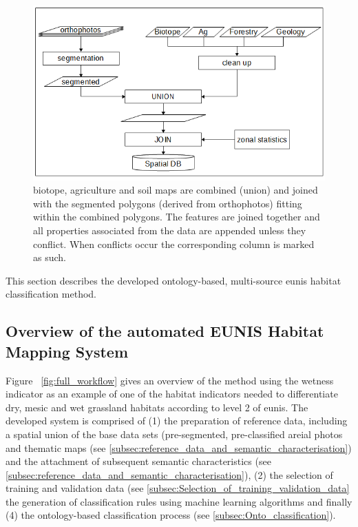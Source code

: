 \documentclass[authoryear,review,12pt,number]{elsarticle}
\begin{document}
\begin{figure} \includegraphics[width=1\textwidth]{diagrams/pre_processing.png}
    \caption{biotope, agriculture and soil maps are combined 
    (union) and joined with the segmented polygons (derived from 
    orthophotos) fitting within the combined polygons. The features are joined 
    together and all properties associated from the data are appended unless 
    they conflict. When conflicts occur the corresponding column is marked as 
    such.\label{fig:pre-processing}}
\end{figure}

This section describes the developed ontology-based, multi-source \gls{eunis} 
habitat classification method.
\label{subsec:method_overview}
\subsection{Overview of the automated EUNIS Habitat Mapping System}
Figure ~\ref{fig:full_workflow} gives an overview of the method using the
wetness indicator as an example of one of the habitat indicators needed to
differentiate dry, mesic and wet grassland habitats according to level 2 of
\gls{eunis}. The developed system is comprised of (1) the preparation of 
reference
data, including a spatial union of the base data sets (pre-segmented,
pre-classified areial photos and thematic maps (see
\ref{subsec:reference_data_and_semantic_characterisation}) and the attachment of
subsequent semantic characteristics (see 
\ref{subsec:reference_data_and_semantic_characterisation}), (2)
the selection of training and validation data (see
\ref{subsec:Selection_of_training_validation_data} the generation of
classification rules using machine learning algorithms and finally (4) the
ontology-based classification process (see \ref{subsec:Onto_classification}). 
\end{document}
